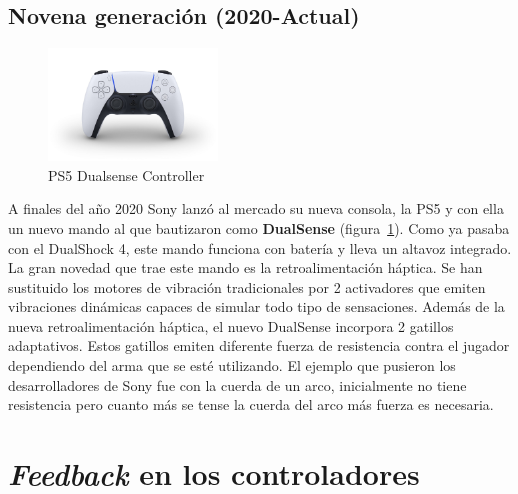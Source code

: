 
\subsection{Novena generaci\'on (2020-Actual)}

\begin{figure}[t]
\centering
\includegraphics[width=0.4\textwidth]{./Imagenes/Bitmap/dualsense.jpg}
\caption{PS5 Dualsense Controller}
\label{Fig:dualsense}
\end{figure}

A finales del a\~no 2020 Sony lanz\'o al mercado su nueva consola, la PS5 y con ella un nuevo mando al que bautizaron como \textbf{DualSense} (figura~\ref{Fig:dualsense}). Como ya pasaba con el DualShock 4, este mando funciona con bater\'ia y lleva un altavoz integrado. La gran novedad que trae este mando es la retroalimentaci\'on h\'aptica. Se han sustituido los motores de vibraci\'on tradicionales por 2 activadores que emiten vibraciones din\'amicas capaces de simular todo tipo de sensaciones. Adem\'as de la nueva retroalimentaci\'on h\'aptica, el nuevo DualSense incorpora 2 gatillos adaptativos. Estos gatillos emiten diferente fuerza de resistencia contra el jugador dependiendo del arma que se est\'e utilizando. El ejemplo que pusieron los desarrolladores de Sony fue con la cuerda de un arco, inicialmente no tiene resistencia pero cuanto m\'as se tense la cuerda del arco m\'as fuerza es necesaria.

\section{\textit{Feedback} en los controladores}

